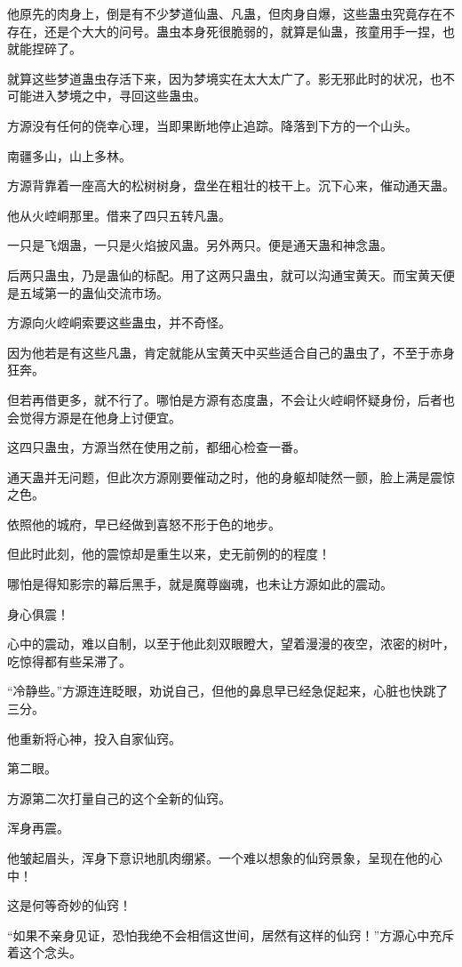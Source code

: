 \begin{this_body}
他原先的肉身上，倒是有不少梦道仙蛊、凡蛊，但肉身自爆，这些蛊虫究竟存在不存在，还是个大大的问号。蛊虫本身死很脆弱的，就算是仙蛊，孩童用手一捏，也就能捏碎了。

就算这些梦道蛊虫存活下来，因为梦境实在太大太广了。影无邪此时的状况，也不可能进入梦境之中，寻回这些蛊虫。

方源没有任何的侥幸心理，当即果断地停止追踪。降落到下方的一个山头。

南疆多山，山上多林。

方源背靠着一座高大的松树树身，盘坐在粗壮的枝干上。沉下心来，催动通天蛊。

他从火崆峒那里。借来了四只五转凡蛊。

一只是飞烟蛊，一只是火焰披风蛊。另外两只。便是通天蛊和神念蛊。

后两只蛊虫，乃是蛊仙的标配。用了这两只蛊虫，就可以沟通宝黄天。而宝黄天便是五域第一的蛊仙交流市场。

方源向火崆峒索要这些蛊虫，并不奇怪。

因为他若是有这些凡蛊，肯定就能从宝黄天中买些适合自己的蛊虫了，不至于赤身狂奔。

但若再借更多，就不行了。哪怕是方源有态度蛊，不会让火崆峒怀疑身份，后者也会觉得方源是在他身上讨便宜。

这四只蛊虫，方源当然在使用之前，都细心检查一番。

通天蛊并无问题，但此次方源刚要催动之时，他的身躯却陡然一颤，脸上满是震惊之色。

依照他的城府，早已经做到喜怒不形于色的地步。

但此时此刻，他的震惊却是重生以来，史无前例的的程度！

哪怕是得知影宗的幕后黑手，就是魔尊幽魂，也未让方源如此的震动。

身心俱震！

心中的震动，难以自制，以至于他此刻双眼瞪大，望着漫漫的夜空，浓密的树叶，吃惊得都有些呆滞了。

“冷静些。”方源连连眨眼，劝说自己，但他的鼻息早已经急促起来，心脏也快跳了三分。

他重新将心神，投入自家仙窍。

第二眼。

方源第二次打量自己的这个全新的仙窍。

浑身再震。

他皱起眉头，浑身下意识地肌肉绷紧。一个难以想象的仙窍景象，呈现在他的心中！

这是何等奇妙的仙窍！

“如果不亲身见证，恐怕我绝不会相信这世间，居然有这样的仙窍！”方源心中充斥着这个念头。


\end{this_body}

